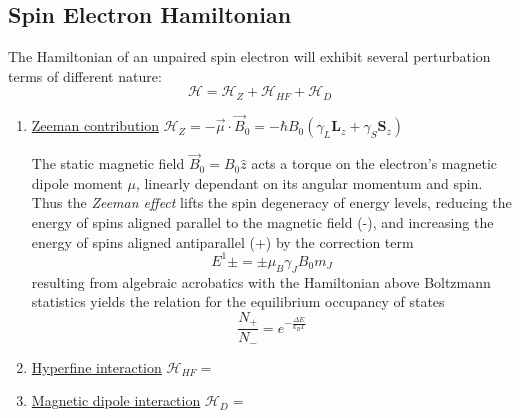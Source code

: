 \documentclass[11.5pt,a4paper]{article}
\begin{document}
\subsection{Spin Electron Hamiltonian}
The Hamiltonian of an unpaired spin electron will exhibit several perturbation terms of different nature:
\begin{equation}
 \mathcal{H} = \mathcal{H}_Z + \mathcal{H}_{HF} + \mathcal{H}_D
\end{equation}
\begin{enumerate}
  \item \uline{Zeeman contribution} $\mathcal{H}_Z = - \vec{\mu} \cdot \vec{B}_0 = -\hbar B_0 (\gamma_L \mathbf{L}_z + \gamma_S \mathbf{S}_z)$

  The static magnetic field $\vec{B}_0 = B_0 \hat{z}$ acts a torque on the electron's magnetic dipole moment $\mu$, linearly dependant on its angular momentum and spin. Thus the \emph{Zeeman effect} lifts the spin degeneracy of energy levels, reducing the energy of spins aligned parallel to the magnetic field (-), and increasing the energy of spins aligned antiparallel (+) by the correction term
  \begin{equation}
   E^1\pm = \pm \mu_B \gamma_J B_0 m_J 
  \end{equation}
  resulting from algebraic acrobatics with the Hamiltonian above \cite[insert]{griffiths}
  Boltzmann statistics yields the relation for the equilibrium occupancy of states
  \begin{equation}
    \frac{N_+}{N_-} = e^{- \frac{\Delta E}{k_B T}}
  \end{equation}


  \item \uline{Hyperfine interaction} $\mathcal{H}_{HF} = $
  \item \uline{Magnetic dipole interaction} $\mathcal{H}_{D} = $
\end{enumerate}
\end{document}
